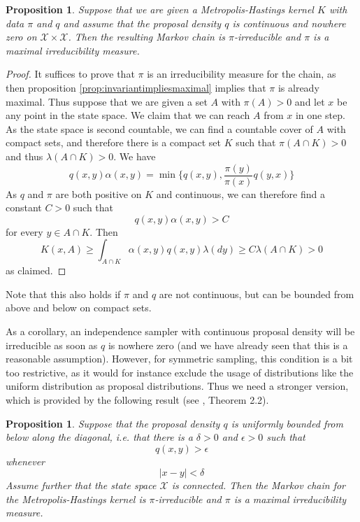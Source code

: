 \documentclass[a4paper, draft]{article}
\theoremstyle{own}
\newtheorem{prop}[thm]{Proposition}
\theoremstyle{remark}
\begin{document}
\begin{prop}
	Suppose that we are given a Metropolis-Hastings kernel $K$ with data $\pi$ and $q$ and assume that the proposal density $q$ is continuous and nowhere zero on ${\mathcal X} \times {\mathcal X}$. Then the resulting Markov chain is $\pi$-irreducible and $\pi$ is a maximal irreducibility measure.
\end{prop}

\begin{proof}
	It suffices to prove that $\pi$ is an irreducibility measure for the chain, as then proposition
	\ref{prop:invariantimpliesmaximal} implies that $\pi$ is already maximal. Thus suppose that we are given a set $A$ with $\pi(A) > 0$ and let $x$ be any point in the state space. We claim that we can reach $A$ from $x$ in one step. As the state space is second countable, we can find a countable cover of $A$ with compact sets, and therefore there is a compact set $K$ such that $\pi(A \cap K) > 0$ and thus $\lambda(A \cap K) > 0$. We have
	$$
	q(x,y) \alpha(x,y) = \min \{  q(x,y), \frac{\pi(y)}{\pi(x)} q(y,x) \}
	$$
	As $q$ and $\pi$ are both positive on $K$ and continuous, we can therefore find a constant 
	$C > 0$ such that 
	$$
	q(x,y) \alpha(x,y) > C
	$$
	for every $y \in A \cap K$. Then
	$$
	K(x,A) \geq \int_{A \cap K} \alpha(x,y )q(x,y) \lambda(dy) \geq C \lambda(A \cap K) > 0
	$$
	as claimed.
\end{proof}

Note that this also holds if $\pi$ and $q$ are not continuous, but can be bounded from above and below on compact sets. 

As a corollary, an independence sampler with continuous proposal density will be irreducible as soon as $q$ is nowhere zero (and we have already seen that this is a reasonable assumption). However, for symmetric sampling, this condition is a bit too restrictive, as it would for instance exclude the usage of distributions like the uniform distribution as proposal distributions. Thus we need a stronger version, which is provided by the following result (see \cite{RobertsTweedie1996}, Theorem 2.2).

\begin{prop}
	Suppose that the proposal density $q$ is uniformly bounded from below along the diagonal, i.e. that there is a $\delta > 0$ and $\epsilon > 0$ such that
	$$
	q(x,y) > \epsilon
	$$
	whenever 
	$$
	| x - y | < \delta
	$$
	Assume further that the state space ${\mathcal X}$ is connected. Then the Markov chain for the Metropolis-Hastings kernel is $\pi$-irreducible and $\pi$ is a maximal irreducibility measure.
\end{prop}
\end{document}
